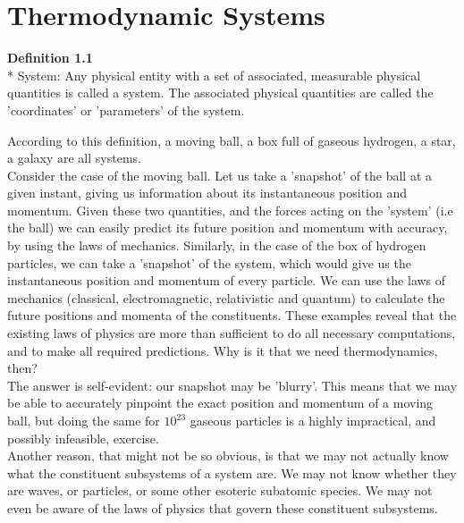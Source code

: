 \documentclass[oneside]{book}
\begin{document}
\section{Thermodynamic Systems}

\begin{mdframed}[style=exercise]
\textbf{Definition 1.1}
\\* System: Any physical entity with a set of associated, measurable physical quantities is called a system. The associated physical quantities are called the 'coordinates' or 'parameters' of the system.\\ 
\end{mdframed}

According to this definition, a moving ball, a box full of gaseous hydrogen, a star, a galaxy are all systems.\\

Consider the case of the moving ball. Let us take a 'snapshot' of the ball at a given instant, giving us information about its instantaneous position and momentum. Given these two quantities, and the forces acting on the 'system' (i.e the ball) we can easily predict its future position and momentum with accuracy, by using the laws of mechanics. Similarly, in the case of the box of hydrogen particles, we can take a 'snapshot' of the system, which would give us the instantaneous position and momentum of every particle. We can use the laws of mechanics (classical, electromagnetic, relativistic and quantum) to calculate the future positions and momenta of the constituents. These examples reveal that the existing laws of physics are more than sufficient to do all necessary computations, and to make all required predictions. Why is it that we need thermodynamics, then?\\

The answer is self-evident: our snapshot may be 'blurry'. This means that we may be able to accurately pinpoint the exact position and momentum of a moving ball, but doing the same for $10^{23}$ gaseous particles is a highly impractical, and possibly infeasible, exercise.\\

Another reason, that might not be so obvious, is that we may not actually know what the constituent subsystems of a system are. We may not know whether they are waves, or particles, or some other esoteric subatomic species. We may not even be aware of the laws of physics that govern these constituent subsystems.\\
\end{document}
